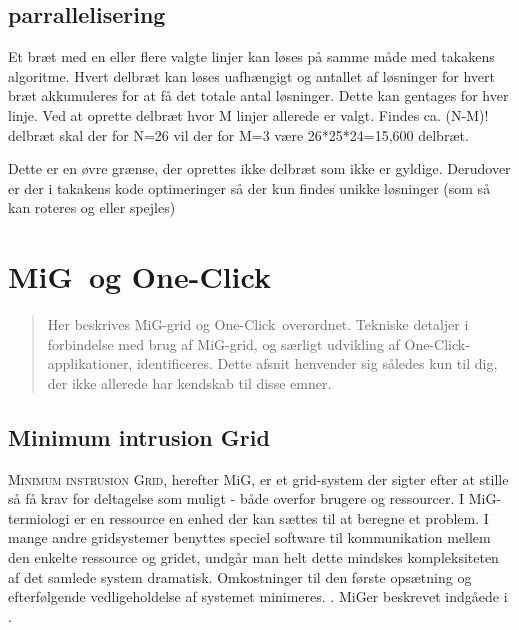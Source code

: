 \documentclass[pdf,draft,a4paper,10pt]{article}
\newcommand{\mig}{MiG}
\newcommand{\oc}{One-Click}
\begin{document}
\subsection{parrallelisering}

Et bræt med en eller flere valgte linjer kan løses på samme måde med takakens algoritme. Hvert delbræt kan løses uafhængigt og antallet af løsninger for hvert bræt akkumuleres for at få det totale antal løsninger.
Dette kan gentages for hver linje. Ved at oprette delbræt hvor M linjer allerede er valgt. Findes ca. (N-M)! delbræt skal der for N=26 vil der for M=3 være 26*25*24=15,600 delbræt.

Dette er en øvre grænse, der oprettes ikke delbræt som ikke er gyldige. Derudover er der i takakens kode optimeringer så der kun findes unikke løsninger (som så kan roteres og eller spejles) 


\section{\mig\ og \oc}\label{migogoneclick}
\begin{verse}
	Her beskrives \mig-grid og \oc\ overordnet. Tekniske detaljer i forbindelse med brug af \mig-grid, og særligt udvikling af \oc-applikationer, identificeres. Dette afsnit henvender sig således kun til dig, der ikke allerede har kendskab til disse emner.  
\end{verse}

\subsection{Minimum intrusion Grid}\label{mig}

\textsc{Minimum instrusion Grid}, herefter \mig, er et grid-system der sigter efter at stille så få krav for deltagelse som muligt - både overfor brugere og ressourcer. I \mig-termiologi er en ressource en enhed der kan sættes til at beregne et problem. I mange andre gridsystemer benyttes speciel software til kommunikation mellem den enkelte ressource og gridet, undgår man helt dette mindskes kompleksiteten af det samlede system dramatisk. Omkostninger til den første opsætning og efterfølgende vedligeholdelse af systemet minimeres. . \mig er beskrevet indgåede i \cite{simplemig,mig}.
\end{document}
